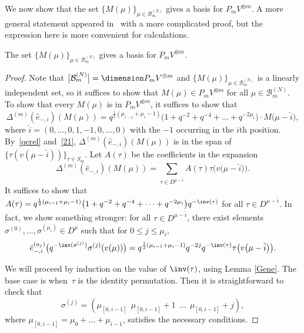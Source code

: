 We now show that the set $ \{M(\mu)\}_{\mu\in \mathcal{B}^{(N)}_m} $ gives a basis for $ P_{m}V^{\otimes m} $. A more general statement appeared in~\cite{KIMRN} with a more complicated proof, but the expression here is more convenient for calculations.
\begin{Theorem}
	The set $ \{M(\mu)\}_{\mu\in \mathcal{B}^{(N)}_m} $ gives a basis for $ P_{m}V^{\otimes m} $.
\end{Theorem}
\begin{proof}
Note that $ \big|\mathcal{B}^{(N)}_m\big|= \dimension P_mV^{\otimes m} $ and $ \{M(\mu)\}_{\mu\in \mathcal{B}^{(N)}_m} $ is a linearly independent set, so it suffices to show that $ M(\mu) \in P_mV^{\otimes m} $ for all $ \mu \in \mathcal{B}^{(N)}_m $. To show that every $ M(\mu) $ is in $ P_{m}V^{\otimes m} $, it suffices to show that \begin{equation} \label{hati}
\Delta^{(m)}(\hat{e}_{-,i}) (M(\mu))=q^{\frac{1}{2}(\mu_{i-1}+\mu_i-1)} \big(1+q^{-2}+q^{-4}+\dots+q^{-2\mu_i}\big) \cdot M\big(\mu-\hat{i}\big),
\end{equation}
where $ \hat{i}=(0,\dots,0,1,-1,0,\dots,0) $ with the $ -1 $ occurring in the $ i $th position. By~\eqref{qerel} and~\eqref{21}, $ \Delta^{(m)} (\hat{e}_{-,i})(M(\mu)) $ is in the span of $ \{\tau(v(\mu-\hat{i}))\}_{\tau\in S_m}$. Let $ A(\tau) $ be the coefficients in the expansion
\[
 \Delta^{(m)} (\hat{e}_{-,i})(M(\mu)) = \sum_{\tau \in D^{\mu-\hat{i}}} A(\tau)\tau \big(v\big(\mu-\hat{i}\big)\big).
\]
It suffices to show that $A(\tau)= q^{\frac{1}{2}(\mu_{i-1}+\mu_i-1)}\big(1+q^{-2}+q^{-4}+\dots+q^{-2\mu_i}\big) q^{-\inv(\tau)}$ for all $\tau \in D^{\mu-\hat{i}}$. In fact, we show something stronger: for all $\tau \in D^{\mu-\hat{i}}$, there exist elements $\sigma^{(0)},\dots, \sigma^{(\mu_i)}\in D^{\mu}$ such that for $0 \leq j \leq \mu_i$,
\[
\hat{e}_{-,i}^{(a_j)} \big( q^{-\inv(\sigma^{(j)})} \sigma^{(j)}(v(\mu)) \big) = q^{\frac{1}{2}(\mu_{i-1}+\mu_i-1)} q^{-2j} q^{-\inv(\tau)} \tau\big(v\big(\mu- \hat{i}\big)\big).
\]

We will proceed by induction on the value of $\inv(\tau)$, using Lemma \ref{Gene}. The base case is when~$\tau$ is the identity permutation. Then it is straightforward to check that
\[
\sigma^{(j)} = (\mu_{[0,i-1]} \ \ \mu_{[0,i-1]}+1 \ \ \dots \ \ \mu_{[0,i-1]}+j),
\]
where $\mu_{[0,i-1]}= \mu_0 + \dots + \mu_{i-1}$, satisfies the necessary conditions.


\end{proof}
